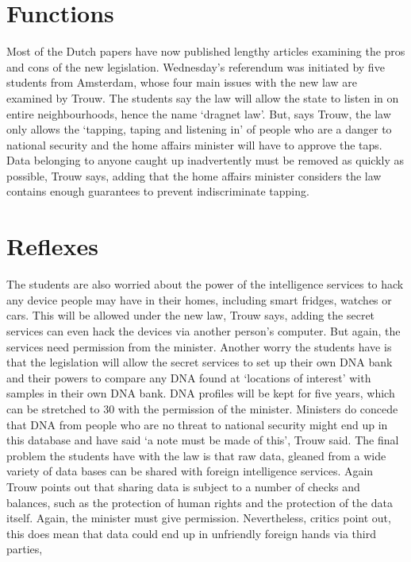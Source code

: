 \documentclass[]{book}
\begin{document}
\hypertarget{functions}{%
\chapter{Functions}\label{functions}}

Most of the Dutch papers have now published lengthy articles examining
the pros and cons of the new legislation. Wednesday's referendum was
initiated by five students from Amsterdam, whose four main issues with
the new law are examined by Trouw. The students say the law will allow
the state to listen in on entire neighbourhoods, hence the name `dragnet
law'. But, says Trouw, the law only allows the `tapping, taping and
listening in' of people who are a danger to national security and the
home affairs minister will have to approve the taps. Data belonging to
anyone caught up inadvertently must be removed as quickly as possible,
Trouw says, adding that the home affairs minister considers the law
contains enough guarantees to prevent indiscriminate tapping.

\hypertarget{reflexes}{%
\chapter{Reflexes}\label{reflexes}}

The students are also worried about the power of the intelligence
services to hack any device people may have in their homes, including
smart fridges, watches or cars. This will be allowed under the new law,
Trouw says, adding the secret services can even hack the devices via
another person's computer. But again, the services need permission from
the minister. Another worry the students have is that the legislation
will allow the secret services to set up their own DNA bank and their
powers to compare any DNA found at `locations of interest' with samples
in their own DNA bank. DNA profiles will be kept for five years, which
can be stretched to 30 with the permission of the minister. Ministers do
concede that DNA from people who are no threat to national security
might end up in this database and have said `a note must be made of
this', Trouw said. The final problem the students have with the law is
that raw data, gleaned from a wide variety of data bases can be shared
with foreign intelligence services. Again Trouw points out that sharing
data is subject to a number of checks and balances, such as the
protection of human rights and the protection of the data itself. Again,
the minister must give permission. Nevertheless, critics point out, this
does mean that data could end up in unfriendly foreign hands via third
parties,
\end{document}
